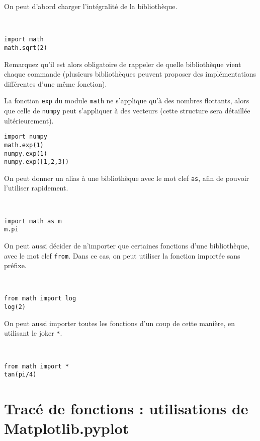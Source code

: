 On peut d'abord charger l'intégralité de la bibliothèque.
\begin{exemple}~
\begin{lstlisting}
import math
math.sqrt(2)
\end{lstlisting}
\end{exemple}
Remarquez qu'il est alors obligatoire de rappeler de quelle bibliothèque vient chaque commande (plusieurs bibliothèques peuvent proposer des implémentations différentes d'une même fonction).
\begin{exemple}
La fonction \texttt{exp} du module \texttt{math} ne s'applique qu'à des nombres flottants, alors que celle de \texttt{numpy} peut s'appliquer à des vecteurs (cette structure sera détaillée ultérieurement). 
\begin{lstlisting}
import numpy
math.exp(1)
numpy.exp(1)
numpy.exp([1,2,3])
\end{lstlisting}
\end{exemple}
On peut donner un alias à une bibliothèque avec le mot clef \texttt{as}, afin de pouvoir l'utiliser rapidement. 
\begin{exemple}~
\begin{lstlisting}
import math as m
m.pi
\end{lstlisting}
\end{exemple}
On peut aussi décider de n'importer que certaines fonctions d'une bibliothèque, avec le mot clef \texttt{from}. Dans ce cas, on peut utiliser la fonction importée sans préfixe. 
\begin{exemple}~
\begin{lstlisting}
from math import log
log(2)
\end{lstlisting}
\end{exemple}
On peut aussi importer toutes les fonctions d'un coup de cette manière, en utilisant le joker \texttt{*}.
\begin{exemple}~
\begin{lstlisting}
from math import *
tan(pi/4)
\end{lstlisting}
\end{exemple}

\section{Tracé de fonctions : utilisations de Matplotlib.pyplot}

